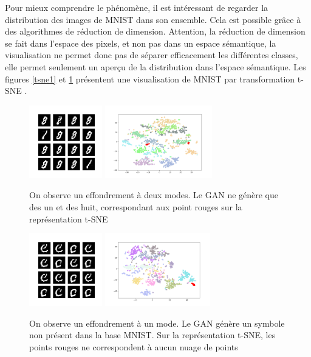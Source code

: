 Pour mieux comprendre le phénomène, il est intéressant de regarder la distribution des images de MNIST dans son ensemble. Cela est possible grâce à des algorithmes de réduction de dimension. Attention, la réduction de dimension se fait dans l'espace des pixels, et non pas dans un espace sémantique, la visualisation ne permet donc pas de séparer efficacement les différentes classes, elle permet seulement un aperçu de la distribution dans l'espace sémantique. Les figures \ref{tsne1} et \ref{tsne2} présentent une visualisation de MNIST par transformation t-SNE \cite{van_der_maaten_visualizing_2008}.

\begin{figure}[!h]
\centering
\includegraphics[height=90pt]{"images/GAN/modes1"}
\includegraphics[height=90pt]{"images/GAN/modes1_tsne"}
\caption{On observe un effondrement à deux modes. Le GAN ne génère que des un et des huit, correspondant aux point rouges sur la représentation t-SNE}
\label{tsne1}
\includegraphics[height=90pt]{"images/GAN/modes2"}
\includegraphics[height=90pt]{"images/GAN/modes2_tsne"}
\caption{On observe un effondrement à un mode. Le GAN génère un symbole non présent dans la base MNIST. Sur la représentation t-SNE, les points rouges ne correspondent à aucun nuage de points}
\label{tsne2}
\end{figure}

